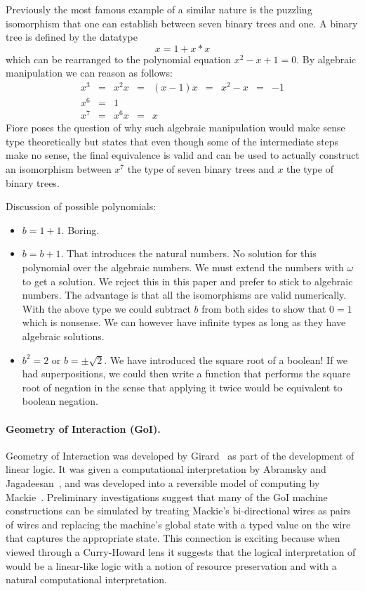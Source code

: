 \documentclass[11pt]{article}
\begin{document}
Previously the most famous example of a similar nature is the puzzling
isomorphism that one can establish between seven binary trees and one.
A binary tree is defined by the datatype
\[
x = 1 + x * x 
\]
which can be rearranged to the polynomial equation $x^2 - x + 1 = 0$. By
algebraic manipulation we can reason as follows:
\[\begin{array}{rclclclcl}
x^3 &=& x^2 x &=& (x-1) x &=& x^2 - x &=& -1 \\
x^6 &=& 1 \\
x^7 &=& x^6 x &=& x
\end{array}\]
Fiore poses the question of why such algebraic manipulation would make sense
type theoretically but states that even though some of the intermediate steps
make no sense, the final equivalence is valid and can be used to actually
construct an isomorphism between $x^7$ the type of seven binary trees 
and $x$ the type of binary trees.

Discussion of possible polynomials:
\begin{itemize}
\item $b=1+1$. Boring.
\item $b=b+1$. That introduces the natural numbers. No solution for this
  polynomial over the algebraic numbers. We must extend the numbers with
  $\omega$ to get a solution. We reject this in this paper and prefer to
  stick to algebraic numbers. The advantage is that all the isomorphisms are
  valid numerically. With the above type we could subtract $b$ from both
  sides to show that $0=1$ which is nonsense. We can however have infinite
  types as long as they have algebraic solutions.
\item $b^2=2$ or $b = \pm \sqrt{2}$. We have introduced the square root of a
  boolean! If we had superpositions, we could then write a function that
  performs the square root of negation in the sense that applying it twice
  would be equivalent to boolean negation.
\end{itemize}

\paragraph*{Geometry of Interaction (GoI).}
Geometry of Interaction was developed by Girard~\cite{girard1989geometry} as
part of the development of linear logic. It was given a computational
interpretation by Abramsky and
Jagadeesan~\cite{Abramsky:1994:NFG:184662.184664}, and was developed into a
reversible model of computing by
Mackie~\cite{Mackie2011,DBLP:conf/popl/Mackie95}. Preliminary investigations
suggest that many of the GoI machine constructions can be simulated by
treating Mackie's bi-directional wires as pairs of wires and replacing the
machine's global state with a typed value on the wire that captures the
appropriate state. This connection is exciting because when viewed through a
Curry-Howard lens it suggests that the logical interpretation of would be a
linear-like logic with a notion of resource preservation and with a natural
computational interpretation.
\end{document}
